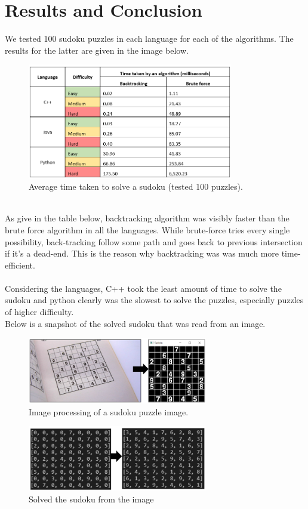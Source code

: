 \documentclass[12pt]{article}
\begin{document}
    \section{Results and Conclusion}
    We tested 100 sudoku puzzles in each language for each of the algorithms. The results for the latter are given in the image below.\\
          \begin{figure}[htp]
    		  \includegraphics[width=0.8\textwidth]{./week9_img/data.png}
    		  \centering
    		  \caption{Average time taken to solve a sudoku (tested 100 puzzles).}
    		  \centering
		  \end{figure}
	\\As give in the table below, backtracking algorithm was visibly faster than the brute force algorithm in all the languages. While brute-force tries every single possibility, back-tracking follow some path and goes back to previous intersection if it’s a dead-end. This is the reason why backtracking was was much more time-efficient.\\
	\\Considering the languages, C++ took the least amount of time to solve the sudoku and python clearly was the slowest to solve the puzzles, especially puzzles of higher difficulty.\\
	Below is a snapshot of the solved sudoku that was read from an image.
	\begin{figure}[h]
		  \includegraphics[width=0.7\textwidth]{./week9_img/transformation.png}
		  \centering
		  \caption{Image processing of a sudoku puzzle image.}
		  \centering
		  \end{figure}
	\begin{figure}[!h]
			  \includegraphics[width=0.7\textwidth]{./week9_img/solve.PNG}
			  \centering
		  \caption{Solved the sudoku from the image}
		  \centering
		  \end{figure}\\
\end{document}
